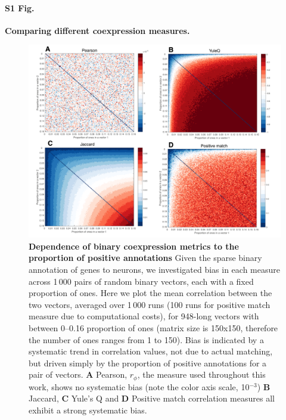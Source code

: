 \documentclass[10pt,letterpaper]{article}
\begin{document}

\paragraph*{S1 Fig.}
{\bf Comparing different coexpression measures.}
\begin{figure}[h]
\centering
    \includegraphics[width=1\textwidth]{CoexpressionMeasures.pdf}
\caption{
\label{fig:S_propOnes}
\textbf{Dependence of binary coexpression metrics to the proportion of positive annotations}
Given the sparse binary annotation of genes to neurons, we investigated bias in each measure across 1\,000 pairs of random binary vectors, each with a fixed proportion of ones.
Here we plot the mean correlation between the two vectors, averaged over 1\,000 runs (100 runs for positive match measure due to computational costs), for 948-long vectors with between 0--0.16 proportion of ones (matrix size is 150x150, therefore the number of ones ranges from 1 to 150).
Bias is indicated by a systematic trend in correlation values, not due to actual matching, but driven simply by the proportion of positive annotations for a pair of vectors.
\textbf{A} Pearson, $r_\phi$, the measure used throughout this work, shows no systematic bias (note the color axis scale, 10$^{-3}$)
\textbf{B} Jaccard, \textbf{C} Yule's Q and \textbf{D} Positive match correlation measures all exhibit a strong systematic bias.
}
\end{figure}
\end{document}
